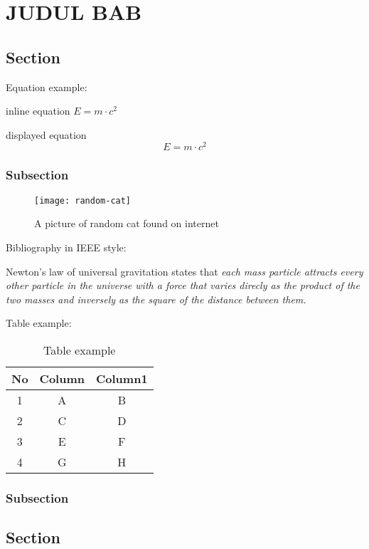 \chapter{JUDUL BAB}
\section{Section}
\lipsum[1]
Equation example:

inline equation $E=m\cdot c^2$

displayed equation
\begin{equation}
    E=m\cdot c^2
\end{equation}
\subsection{Subsection}
\begin{figure}[H]
    \centering
    \texttt{[image: random-cat]}
    \caption{A picture of random cat found on internet}\label{random-cat}
\end{figure}

Bibliography in IEEE style:

Newton's law of universal gravitation states that \textit{each mass particle attracts every other particle in the universe with a force that varies direcly as the product of the two masses and inversely as the square of the distance between them.}\cite{book:classical}

Table example:

\begin{table}[H]
\centering
\begin{tabular}{ccc}
\hline
No & Column & Column1 \\ \hline
1  & A      & B       \\
2  & C      & D       \\
3  & E      & F       \\
4  & G      & H       \\ \hline
\end{tabular}
\caption{Table example}\label{table1}
\end{table}

\lipsum[1]
\subsection{Subsection}
\lipsum[1]
\section{Section}
\lipsum[2]
